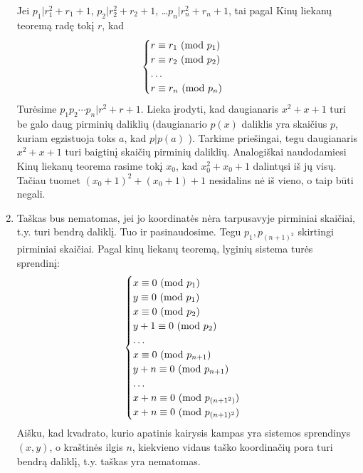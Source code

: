 \begin{enumerate}
Jei $p_1|r_1^2 +r_1 +1$, $p_2|r_2^2 + r_2 +1$,
\dots $p_n|r_n^2 + r_n +1$, tai pagal Kinų liekanų teoremą radę
tokį $r$, kad 
$$\begin{cases}
r \equiv r_1 \ (\text{mod } p_1)\\
r \equiv r_2 \ (\text{mod } p_2)\\
\hdots \\
r \equiv r_n \ (\text{mod } p_n)
\end{cases}$$
Turėsime $p_1p_2\cdots p_n|r^2 + r +1$. Lieka įrodyti, kad
daugianaris $x^2 + x + 1$ turi be galo daug pirminių daliklių
(daugianario $p(x)$ daliklis yra skaičius $p$, kuriam egzistuoja
toks $a$, kad $p|p(a)$ ). Tarkime priešingai, tegu daugianaris
$x^2 + x + 1$ turi baigtinį skaičių pirminių daliklių. Analogiškai
naudodamiesi Kinų liekanų teorema rasime tokį $x_0$, kad $x_0^2 +
x_0 + 1$ dalintųsi iš jų visų. Tačiau tuomet $(x_0+1)^2 + (x_0 + 1)
+ 1$ nesidalins nė iš vieno, o taip būti negali.
\item 
Taškas bus nematomas, jei jo koordinatės nėra tarpusavyje pirminiai
skaičiai, t.y. turi bendrą daliklį. Tuo ir pasinaudosime. Tegu
$p_1, p_{(n+1)^2}$ skirtingi pirminiai skaičiai. Pagal kinų liekanų
teoremą, lyginių sistema turės sprendinį:
$$\begin{cases}
x \equiv 0 \ (\text{mod } p_1)\\
y \equiv 0 \ (\text{mod } p_1)\\
x \equiv 0 \ (\text{mod } p_2)\\
y + 1\equiv 0\ (\text{mod } p_2)\\
\hdots\\
x \equiv 0 \ (\text{mod } p_{n+1})\\
y + n \equiv 0 \ (\text{mod } p_{n+1})\\
\hdots \\
x + n \equiv 0 \ (\text{mod } p_{(n+1^2)})\\
x + n \equiv 0 \ (\text{mod } p_{(n+1)^2})\\
\end{cases}$$
Aišku, kad kvadrato, kurio apatinis kairysis kampas yra sistemos
sprendinys $(x,y)$, o kraštinės ilgis $n$, kiekvieno vidaus taško
koordinačių pora turi bendrą daliklį, t.y. taškas yra nematomas.
\end{enumerate} 
